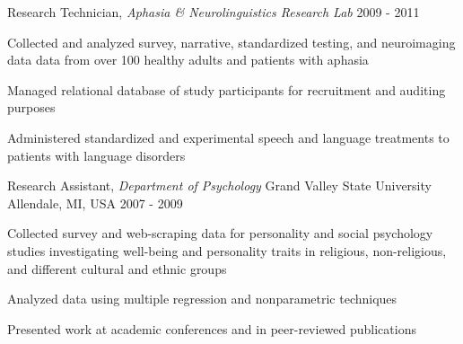 \begin{cventries}
  \cventry
    {Research Technician, \textit{Aphasia \& Neurolinguistics Research Lab}} %
    {} %
    {} %
    {2009 - 2011} %
    {
      \begin{cvitems} %
        \item {Collected and analyzed survey, narrative, standardized testing, and neuroimaging data data from over 100 healthy adults and patients with aphasia}
        \item {Managed relational database of study participants for recruitment and auditing purposes}
        \item {Administered standardized and experimental speech and language treatments to patients with language disorders}
      \end{cvitems}
    }

  \cventry
    {Research Assistant, \textit{Department of Psychology}} %
    {Grand Valley State University} %
    {Allendale, MI, USA} %
    {2007 - 2009} %
    {
      \begin{cvitems} %
        \item {Collected survey and web-scraping data for personality and social psychology studies investigating well-being and personality traits in religious, non-religious, and different cultural and ethnic groups}
        \item {Analyzed data using multiple regression and nonparametric techniques}
        \item {Presented work at academic conferences and in peer-reviewed publications}
      \end{cvitems}
    }

\end{cventries}
